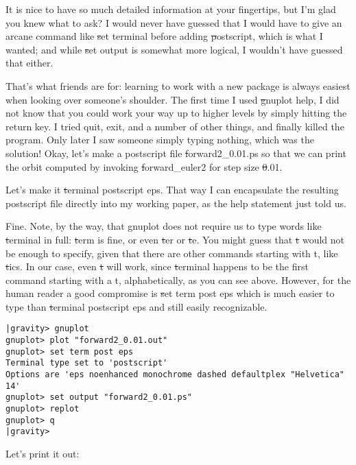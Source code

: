 \abc

\alice
It is nice to have so much detailed information at your fingertips,
but I'm glad you knew what to ask?  I would never have guessed that I
would have to give an arcane command like {\st set terminal} before
adding {\st postscript}, which is what I wanted; and while {\st set
output} is somewhat more logical, I wouldn't have guessed that either.

\carol
That's what friends are for: learning to work with a new package is
always easiest when looking over someone's shoulder.  The first time I
used {\st gnuplot help}, I did not know that you could work your way up
to higher levels by simply hitting the return key.  I tried quit, exit,
and a number of other things, and finally killed the program.  Only
later I saw someone simply typing nothing, which was the solution!
Okay, let's make a postscript file {\st forward2\_0.01.ps} so that we
can print the orbit computed by invoking {\st forward\_euler2} for
step size {\st 0.01}.

\alice
Let's make it {\st terminal postscript eps}.  That way I can encapsulate
the resulting postscript file directly into my working paper, as the
help statement just told us.

\carol
Fine.  Note, by the way, that gnuplot does not require us to type
words like {\st terminal} in full: {\st term} is fine, or even {\st
ter} or {\st te}.  You might guess that {\st t} would not be enough to
specify, given that there are other commands starting with t, like
{\st tics}.  In our case, even {\st t} will work, since {\st terminal}
happens to be the first command starting with a t, alphabetically, as
you can see above.  However, for the human reader a good compromise is
{\st set term post eps} which is much easier to type than
{\st terminal postscript eps} and still easily recognizable.

\cba

\begin{small}
\begin{verbatim}
|gravity> gnuplot
gnuplot> plot "forward2_0.01.out"
gnuplot> set term post eps
Terminal type set to 'postscript'
Options are 'eps noenhanced monochrome dashed defaultplex "Helvetica" 14'
gnuplot> set output "forward2_0.01.ps"
gnuplot> replot
gnuplot> q
|gravity> 
\end{verbatim}
\end{small}

\abc

\carol
Let's print it out:


